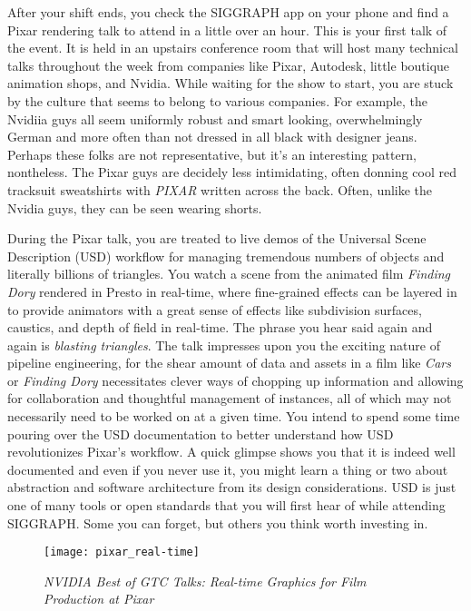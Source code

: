 \documentclass[../main.tex]{subfiles}
\begin{document}
After your shift ends, you check the SIGGRAPH app on your phone and find a Pixar rendering talk to attend in a little over an hour. This is your first talk of the event. It is held in an upstairs conference room that will host many technical talks throughout the week from companies like Pixar, Autodesk, little boutique animation shops, and Nvidia. While waiting for the show to start, you are stuck by the culture that seems to belong to various companies. For example, the Nvidiia guys all seem uniformly robust and smart looking, overwhelmingly German and more often than not dressed in all black with designer jeans. Perhaps these folks are not representative, but it's an interesting pattern, nontheless. The Pixar guys are decidely less intimidating, often donning cool red tracksuit sweatshirts with \textit{PIXAR} written across the back. Often, unlike the Nvidia guys, they can be seen wearing shorts.

During the Pixar talk, you are treated to live demos of the Universal Scene Description  (USD) workflow for managing tremendous numbers of objects and literally billions of triangles. You watch a scene from the animated film \textit{Finding Dory} rendered in Presto in real-time, where fine-grained effects can be layered in to provide animators with a great sense of effects like subdivision surfaces, caustics, and depth of field in real-time. The phrase you hear said again and again is \textit{blasting triangles}. The talk impresses upon you the exciting nature of pipeline engineering, for the shear amount of data and assets in a film like \textit{Cars} or \textit{Finding Dory} necessitates clever ways of chopping up information and allowing for collaboration and thoughtful management of instances, all of which may not necessarily need to be worked on at a given time. You intend to spend some time pouring over the USD documentation to better understand how USD revolutionizes Pixar's workflow. A quick glimpse shows you that it is indeed well documented and even if you never use it, you might learn a thing or two about abstraction and software architecture from its design considerations. USD is just one of many tools or open standards that you will first hear of while attending SIGGRAPH. Some you can forget, but others you think worth investing in.


\begin{figure}[h!]
	\centering
	\texttt{[image: pixar\_real-time]}
	\caption*{\textit{NVIDIA Best of GTC Talks: Real-time Graphics for Film Production at Pixar}}
\end{figure}
\end{document}
